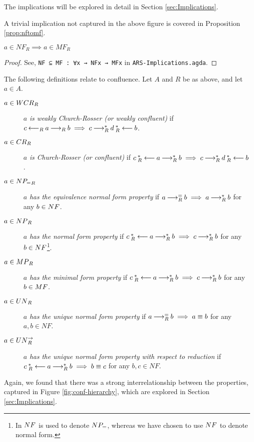 The implications will be explored in detail in Section \ref{sec:Implications}. 

A trivial implication not captured in the above figure is covered in Proposition \ref{prop:nftomf}. 
\begin{proposition}\label{prop:nftomf}
    $a\in NF_R \implies a \in MF_R$ 
\end{proposition}    
\begin{proof}
    See, \verb|NF ⊆ MF : ∀x → NFx → MFx| in \texttt{ARS-Implications.agda}.
\end{proof}

\begin{definition} The following definitions relate to confluence. Let $A$ and $R$ be as above, and let $a \in A$.
    \begin{description}
        \item[$a \in \WCR_R$] \emph{$a$ is weakly Church-Rosser (or weakly confluent)} if $c \mathbin{\longleftarrow_R} a \mathbin{\longrightarrow_R} b \implies c \mathbin{\longrightarrow_R^*} d \mathbin{_R^*\longleftarrow} b$.
        \item[$a \in \CR_R$] \emph{$a$ is Church-Rosser (or confluent)} if $c \mathbin{_R^*\longleftarrow} a \mathbin{\longrightarrow_R^*} b \implies c \mathbin{\longrightarrow_R^*} d \mathbin{_R^*\longleftarrow} b$.
        \item[$a \in \NPe_R$] \emph{$a$ has the equivalence normal form property} if $a \mathbin{\longrightarrow_R^=} b \implies a\mathbin{\longrightarrow_R^*} b$ for any $b \in \NF$.
        \item[$a \in \NP_R$] \emph{$a$ has the normal form property} if $c \mathbin{_R^*\longleftarrow} a \mathbin{\longrightarrow_R^*} b \implies c \mathbin{\longrightarrow_R^*} b$ for any $b \in \NF$\footnote{In \terese $\NF$ is used to denote $\NPe$, whereas we have chosen to use $\NF$ to denote normal form.}. 
        \item[$a \in \MP_R$] \emph{$a$ has the minimal form property} if $c \mathbin{_R^*\longleftarrow} a \mathbin{\longrightarrow_R^*} b \implies c \mathbin{\longrightarrow_R^*} b$ for any $b \in \MF$.
        \item[$a \in \UN_R$] \emph{$a$ has the unique normal form property} if $a \mathbin{\longrightarrow_R^=} b \implies a \equiv b$  for any $a, b \in NF$.
        \item[$a \in \UNto_R$] \emph{$a$ has the unique normal form property with respect to reduction} if $c \mathbin{_R^*\longleftarrow} a \mathbin{\longrightarrow_R^*} b  \implies b \equiv c$  for any $b, c \in NF$.
    \end{description}
\end{definition}

Again, we found that there was a strong interrelationship between the properties, captured in Figure \ref{fig:conf-hierarchy}, which are explored in Section \ref{sec:Implications}.

